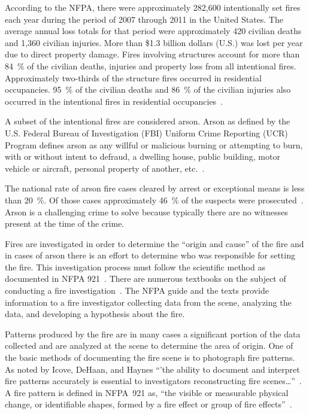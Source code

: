 \documentclass[twoside]{uocthesis}
\begin{document}
According to the NFPA, there were approximately 282,600 intentionally set fires each year during the period of 2007 through 2011 in the United States. The average annual loss totals for that period were approximately 420 civilian deaths and 1,360 civilian injuries. More than \$1.3 billion dollars (U.S.) was lost per year due to direct property damage. Fires involving structures account for more than 84~\% of the civilian deaths, injuries and property loss from all intentional fires.  Approximately two-thirds of the structure fires occurred in residential occupancies.  95~\% of the civilian deaths and 86~\% of the civilian injuries also occurred in the intentional fires in residential occupancies~\cite{Campbell:2014}.

A subset of the intentional fires are considered arson.  Arson as defined by the U.S. Federal Bureau of Investigation (FBI) Uniform Crime Reporting (UCR) Program defines arson as any willful or malicious burning or attempting to burn, with or without intent to defraud, a dwelling house, public building, motor vehicle or aircraft, personal property of another, etc.~\cite{Crime:2010}.

The national rate of arson fire cases cleared by arrest or exceptional means is less than 20~\%.  Of those cases approximately 46~\% of the suspects were prosecuted~\cite{Campbell:2014}. Arson is a challenging crime to solve because typically there are no witnesses present at the time of the crime.

Fires are investigated in order to determine the ``origin and cause'' of the fire and in cases of arson there is an effort to determine who was responsible for setting the fire.  This investigation process must follow the scientific method as documented in NFPA 921~\cite{NFPA_921}.  There are numerous textbooks on the subject of conducting a fire investigation~\cite{Almirall:2004,Fire_Investigation,DeHaan:2012,Icove:2013,Lentini:2006,Noon:1995}. The NFPA guide and the texts provide information to a fire investigator collecting data from the scene, analyzing the data, and developing a hypothesis about the fire.

Patterns produced by the fire are in many cases a significant portion of the data collected and are analyzed at the scene to determine the area of origin.  One of the basic methods of documenting the fire scene is to photograph fire patterns.  As noted by Icove, DeHaan, and Haynes  ``'the ability to document and interpret fire patterns accurately is essential to investigators reconstructing fire scenes…''~\cite{Icove:2013}.  A fire pattern is defined in NFPA~921 as, ``the visible or measurable physical change, or identifiable shapes, formed by a fire effect or group of fire effects''~\cite{NFPA_921}.
\end{document}

